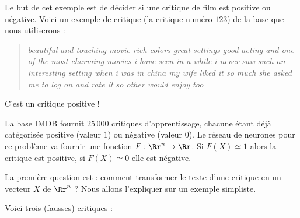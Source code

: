 \documentclass[11pt,class=report,crop=false]{standalone}
\begin{document}
Le but de cet exemple est de décider si une critique de film est positive ou négative.
Voici un exemple de critique (la critique numéro $123$) de la base que nous utiliserons :
\begin{quote} 
\emph{beautiful and touching movie rich colors great settings good acting and one of the most charming movies i have seen in a while i never saw such an interesting setting when i was in china my wife liked it so much she asked me to log on and rate it so other would enjoy too}
\end{quote}
C'est un critique positive !


La base IMDB fournit $25\,000$ critiques d'apprentissage, chacune étant déjà catégorisée positive (valeur $1$) ou négative (valeur $0$).
Le réseau de neurones pour ce problème va fournir une fonction $F : \Rr^n \to \Rr$.
Si $F(X) \simeq 1$ alors la critique est positive, si $F(X) \simeq 0$ elle est négative.

La première question est : comment transformer le texte d'une critique en un vecteur $X$ de $\Rr^n$ ?
Nous allons l'expliquer sur un exemple simpliste.

Voici trois (fausses) critiques :
\end{document}
